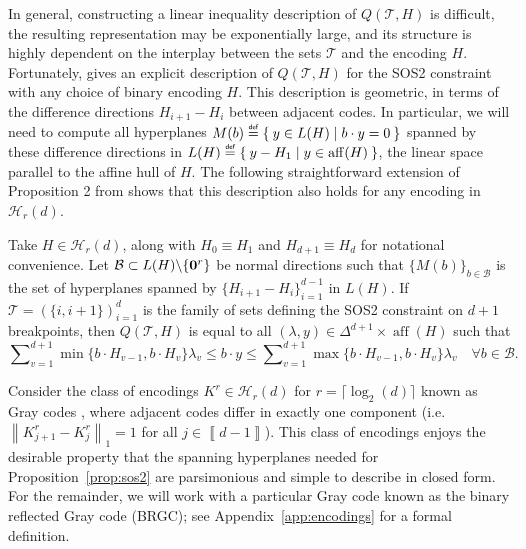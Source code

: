\documentclass[opre,nonblindrev]{informs3} %
\newcommand{\calT}{\mathcal{T}}
\newcommand{\aff}{\operatorname{aff}}
\newcommand\defeq{\mathrel{\overset{\makebox[0pt]{\mbox{\normalfont\tiny\sffamily def}}}{=}}}
\newcommand{\norm}[1]{\left\lVert#1\right\rVert}
\newcommand{\sidx}[1]{\left\llbracket     #1 \right\rrbracket}
\begin{document}

In general, constructing a linear inequality description of $Q(\calT,H)$ is difficult, the resulting representation may be exponentially large, and its structure is highly dependent on the interplay between the sets $\calT$ and the encoding $H$.
Fortunately, \cite[Proposition 2]{Vielma:2016} gives an explicit description of $Q(\calT,H)$ for the SOS2 constraint with any choice of binary encoding $H$. This description is geometric, in terms of the difference directions $H_{i+1}-H_i$ between adjacent codes. In particular, we will need to compute all hyperplanes $M(b) \defeq \Set{ y \in L(H) | b \cdot y = 0}$ spanned by these difference directions in $L(H) \defeq \Set{y - H_1 | y \in \aff(H) }$, the linear space parallel to the affine hull of $H$. The following straightforward extension of Proposition 2 from \cite{Vielma:2016} shows that this description  also holds for any encoding in  $\mathcal{H}_r(d)$.

\begin{proposition} \label{prop:sos2}
Take $H \in \mathcal{H}_r(d)$, along with $H_0 \equiv H_1$ and $H_{d+1} \equiv H_d$ for notational convenience. Let $\mathcal{B} \subset L(H) \backslash \{{\bf 0}^r\}$ be normal directions such that $\{M(b)\}_{b \in \mathcal{B}}$ is the set of hyperplanes spanned by $\{H_{i+1}-H_i\}_{i=1}^{d-1}$ in $L(H)$. If $\calT = (\{i,i+1\})_{i=1}^d$ is the family of sets defining the SOS2 constraint on $d+1$ breakpoints, then $Q(\calT,H)$ is equal to all $(\lambda,y) \in \Delta^{d+1} \times \aff(H)$ such that
\begin{equation*}
        \sum\nolimits_{v=1}^{d+1} \min\{b \cdot H_{v-1}, b \cdot H_{v}\}\lambda_v \leq b \cdot y \leq \sum\nolimits_{v=1}^{d+1} \max\{b \cdot H_{v-1}, b \cdot H_{v}\}\lambda_v \quad \forall b \in \mathcal{B}.
    \end{equation*}
\end{proposition}

Consider the class of encodings $K^r \in \mathcal{H}_r(d)$ for $r = \lceil \log_2(d) \rceil$ known as Gray codes \citep{Savage:1997}, where adjacent codes differ in exactly one component (i.e. $\norm{K^r_{j+1}-K^r_j}_1=1$ for all $j\in \sidx{d-1}$). This class of encodings enjoys the desirable property that the spanning hyperplanes needed for Proposition~\ref{prop:sos2} are parsimonious and simple to describe in closed form. For the remainder, we will work with a particular Gray code known as the binary reflected Gray code (BRGC); see Appendix~\ref{app:encodings} for a formal definition.
\end{document}
